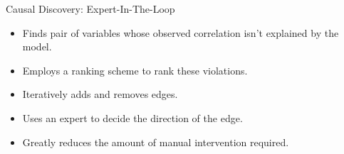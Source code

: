 \documentclass{beamer}
\begin{document}
\begin{frame}{Causal Discovery: Expert-In-The-Loop}

	\vspace{2em}

	\begin{itemize}
		\item Finds pair of variables whose observed correlation isn't explained by the model.
		\item Employs a ranking scheme to rank these violations.
		\item Iteratively adds and removes edges.
		\item Uses an expert to decide the direction of the edge.
		\item Greatly reduces the amount of manual intervention required.
	\end{itemize}
\end{frame}
\end{document}
